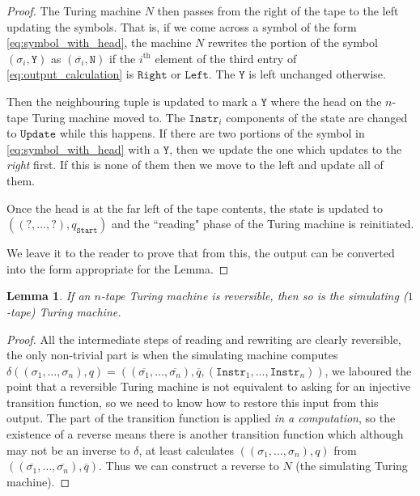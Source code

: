 \documentclass[12pt]{article}
\theoremstyle{plain}
\newtheorem{lemma}[thm]{Lemma}
\theoremstyle{definition}
\begin{document}
\begin{proof}
	The Turing machine $N$ then passes from the right of the tape to the left updating the symbols. That is, if we come across a symbol of the form \eqref{eq:symbol_with_head}, the machine $N$ rewrites the portion of the symbol $(\sigma_i, \texttt{Y})$ as $(\overline{\sigma_i}, \texttt{N})$ if the $i^{\text{th}}$ element of the third entry of \eqref{eq:output_calculation} is $\texttt{Right}$ or $\texttt{Left}$. The $\texttt{Y}$ is left unchanged otherwise.
	
	Then the neighbouring tuple is updated to mark a $\texttt{Y}$ where the head on the $n$-tape Turing machine moved to. The $\texttt{Instr}_i$ components of the state are changed to $\texttt{Update}$ while this happens. If there are two portions of the symbol in \eqref{eq:symbol_with_head} with a $\texttt{Y}$, then we update the one which updates to the \emph{right} first. If this is none of them then we move to the left and update all of them.
	
	Once the head is at the far left of the tape contents, the state is updated to $((?,\ldots, ?), q_{\texttt{Start}})$ and the ``reading" phase of the Turing machine is reinitiated.
	
	We leave it to the reader to prove that from this, the output can be converted into the form appropriate for the Lemma.
\end{proof}
	
	\begin{lemma}
		If an $n$-tape Turing machine is reversible, then so is the simulating ($1$-tape) Turing machine.
		\end{lemma}
	\begin{proof}
		All the intermediate steps of reading and rewriting are clearly reversible, the only non-trivial part is when the simulating machine computes $\delta((\sigma_1, \ldots, \sigma_n), q) = ((\overline{\sigma_1},\ldots, \overline{\sigma_n}), \overline{q}, (\texttt{Instr}_1, \ldots, \texttt{Instr}_n))$, we laboured the point that a reversible Turing machine is not equivalent to asking for an injective transition function, so we need to know how to restore this input from this output. The part of the transition function is applied \emph{in a computation}, so the existence of a reverse means there is another transition function which although may not be an inverse to $\delta$, at least calculates $((\sigma_1, \ldots, \sigma_n), q)$ from $((\overline{\sigma_1},\ldots, \overline{\sigma_n}), \overline{q})$. Thus we can construct a reverse to $N$ (the simulating Turing machine).
		\end{proof}
	
\end{document}
